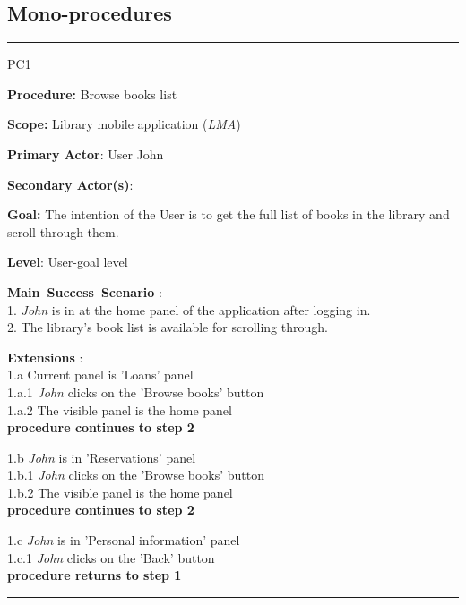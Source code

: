 \subsection{Mono-procedures}

\vspace{0.5cm}
\hrule
\begin{lyxlist}{PC1}
\small{
\item [\textbf{Procedure:}] Browse books list
\item [\textbf{Scope:}] Library mobile application (\emph{LMA})
\item [\textbf{Primary Actor}:] User John
\item [\textbf{Secondary Actor(s)}:] 
\item [\textbf{Goal:}] The intention of the User is to get the full list of
books in the library and scroll through them.
\item [\textbf{Level}:] User-goal level
\item [\textbf{Main~Success~Scenario}]:\\
1. \emph{John} is in at the home panel of the application after logging in.\\
2. The library's book list is available for scrolling through.\\


\item [\textbf{Extensions}]:\\
1.a Current panel is 'Loans' panel\\
\hspace*{0.5cm} 1.a.1 \emph{John} clicks on the 'Browse books' button\\
\hspace*{0.5cm} 1.a.2 The visible panel is the home panel\\
\hspace*{0.5cm} \textbf{procedure continues to step 2}

1.b \emph{John} is in 'Reservations' panel\\
\hspace*{0.5cm} 1.b.1 \emph{John} clicks on the 'Browse books' button\\
\hspace*{0.5cm} 1.b.2 The visible panel is the home panel\\
\hspace*{0.5cm} \textbf{procedure continues to step 2}

1.c \emph{John} is in 'Personal information' panel\\
\hspace*{0.5cm} 1.c.1 \emph{John} clicks on the 'Back' button\\
\hspace*{0.5cm} \textbf{procedure returns to step 1}

}


\end{lyxlist}
\hrule

